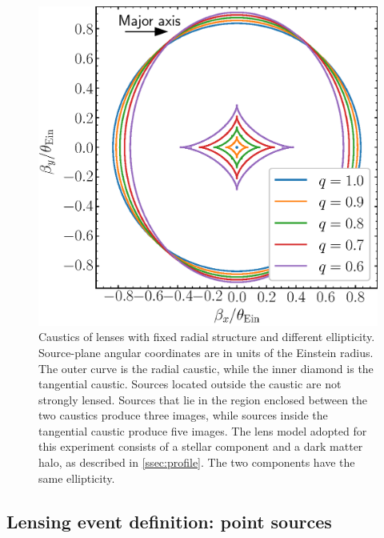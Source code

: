 \documentclass{aa}
\begin{document}
\begin{figure}
\includegraphics[width=\columnwidth]{composite_caustics.eps}
\caption{
Caustics of lenses with fixed radial structure and different ellipticity.
Source-plane angular coordinates are in units of the Einstein radius.
The outer curve is the radial caustic, while the inner diamond is the tangential caustic. Sources located outside the caustic are not strongly lensed. Sources that lie in the region enclosed between the two caustics produce three images, while sources inside the tangential caustic produce five images.
The lens model adopted for this experiment consists of a stellar component and a dark matter halo, as described in \ref{ssec:profile}. The two components have the same ellipticity.
\label{fig:ellcaust}
}
\end{figure}

\subsection{Lensing event definition: point sources}\label{ssec:lensdefpoint}
\end{document}
